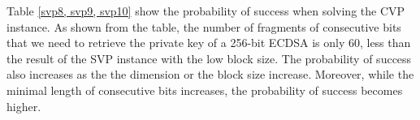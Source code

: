 
Table \ref{svp8, svp9, svp10} show the probability of success when solving the CVP instance.
As shown from the table, 
  the number of fragments of consecutive bits that we need to retrieve the private key of a 256-bit ECDSA is only $60$, less than the result of the SVP instance with the low block size.
 The probability of success also increases as the the dimension or the block size increase.
Moreover, while the minimal length of consecutive bits increases, the probability of success becomes higher. 




